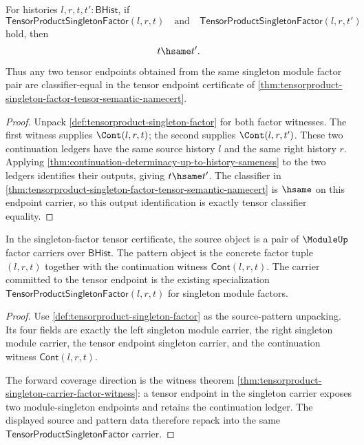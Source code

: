 \begin{theorem}
\label{thm:tensorproduct-singleton-factor-classifier-uniqueness}
For histories $l,r,t,t':\mathsf{BHist}$, if
$$
\mathsf{TensorProductSingletonFactor}(l,r,t)
\quad\text{and}\quad
\mathsf{TensorProductSingletonFactor}(l,r,t')
$$
hold, then
$$
t\hsame t'.
$$
Thus any two tensor endpoints obtained from the same singleton module factor pair are classifier-equal in the tensor endpoint certificate of \autoref{thm:tensorproduct-singleton-factor-tensor-semantic-namecert}.
\end{theorem}
\begin{proof}
Unpack \autoref{def:tensorproduct-singleton-factor} for both factor witnesses. The first witness supplies $\Cont(l,r,t)$; the second supplies $\Cont(l,r,t')$. These two continuation ledgers have the same source history $l$ and the same right history $r$. Applying \autoref{thm:continuation-determinacy-up-to-history-sameness} to the two ledgers identifies their outputs, giving $t\hsame t'$. The classifier in \autoref{thm:tensorproduct-singleton-factor-tensor-semantic-namecert} is $\hsame$ on this endpoint carrier, so this output identification is exactly tensor classifier equality.
\end{proof}

\begin{theorem}
\label{thm:tensorproduct-source-pattern-obligation}
In the singleton-factor tensor certificate, the source object is a pair of
$\ModuleUp$ factor carriers over $\mathsf{BHist}$. The pattern object is the
concrete factor tuple $(l,r,t)$ together with the continuation witness
$\mathsf{Cont}(l,r,t)$. The carrier committed to the tensor endpoint is the
existing specialization
$\mathsf{TensorProductSingletonFactor}(l,r,t)$ for singleton module factors.
\end{theorem}
\begin{proof}
Use \autoref{def:tensorproduct-singleton-factor} as the source-pattern
unpacking. Its four fields are exactly the left singleton module carrier, the
right singleton module carrier, the tensor endpoint singleton carrier, and the
continuation witness $\mathsf{Cont}(l,r,t)$.

The forward coverage direction is the witness theorem
\autoref{thm:tensorproduct-singleton-carrier-factor-witness}: a tensor endpoint
in the singleton carrier exposes two module-singleton endpoints and retains the
continuation ledger. The displayed source and pattern data therefore repack
into the same $\mathsf{TensorProductSingletonFactor}$ carrier.
\end{proof}

